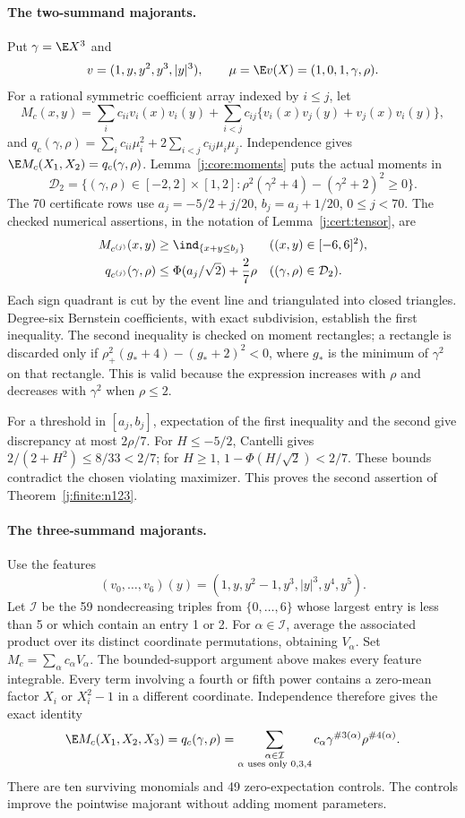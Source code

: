 \paragraph{The two-summand majorants.}
Put $\gamma=\E X^3$ and
\[
 v=(1,y,y^2,y^3,|y|^3),\qquad \mu=\E v(X)=(1,0,1,\gamma,\rho).
\]
For a rational symmetric coefficient array indexed by $i\le j$, let
\[
 M_c(x,y)=\sum_i c_{ii}v_i(x)v_i(y)+
 \sum_{i<j}c_{ij}\{v_i(x)v_j(y)+v_j(x)v_i(y)\},
\]
and $q_c(\gamma,\rho)=\sum_i c_{ii}\mu_i^2+
2\sum_{i<j}c_{ij}\mu_i\mu_j$.
Independence gives $\E M_c(X_1,X_2)=q_c(\gamma,\rho)$.
Lemma~\ref{j:core:moments} puts the actual moments in
\[
 \mathcal D_2=\{(\gamma,\rho)\in[-2,2]\times[1,2]:
 \rho^2(\gamma^2+4)-(\gamma^2+2)^2\ge0\}.
\]
The 70 certificate rows use
$a_j=-5/2+j/20$, $b_j=a_j+1/20$, $0\le j<70$.
The checked numerical assertions, in the notation of
Lemma~\ref{j:cert:tensor}, are
\begin{align*}
 M_{c^{(j)}}(x,y)&\ge\ind_{\{x+y\le b_j\}}
                    &&((x,y)\in[-6,6]^2),\\
 q_{c^{(j)}}(\gamma,\rho)&\le\Phi(a_j/\sqrt2)+\frac27\rho
                    &&((\gamma,\rho)\in\mathcal D_2).
\end{align*}
Each sign quadrant is cut by the event line and triangulated into
closed triangles.  Degree-six Bernstein coefficients, with exact
subdivision, establish the first inequality.  The second inequality is
checked on moment rectangles; a rectangle is discarded only if
$\rho_+^2(g_*+4)-(g_*+2)^2<0$, where $g_*$ is the minimum of
$\gamma^2$ on that rectangle.  This is valid because the expression
increases with $\rho$ and decreases with $\gamma^2$ when $\rho\le2$.

For a threshold in $[a_j,b_j]$, expectation of the first inequality and
the second give discrepancy at most $2\rho/7$.
For $H\le-5/2$, Cantelli gives $2/(2+H^2)\le8/33<2/7$;
for $H\ge1$, $1-\Phi(H/\sqrt2)<2/7$.
These bounds contradict the chosen violating maximizer.  This proves
the second assertion of Theorem~\ref{j:finite:n123}.

\paragraph{The three-summand majorants.}
Use the features
\[
 (v_0,\ldots,v_6)(y)=(1,y,y^2-1,y^3,|y|^3,y^4,y^5).
\]
Let $\mathcal I$ be the 59 nondecreasing triples from $\{0,\ldots,6\}$
whose largest entry is less than 5 or which contain an entry 1 or 2.
For $\alpha\in\mathcal I$, average the associated product over its
distinct coordinate permutations, obtaining $V_\alpha$.
Set $M_c=\sum_\alpha c_\alpha V_\alpha$.
The bounded-support argument above makes every feature integrable.
Every term involving a fourth or fifth power contains a zero-mean
factor $X_i$ or $X_i^2-1$ in a different coordinate.  Independence
therefore gives the exact identity
\[
 \E M_c(X_1,X_2,X_3)=q_c(\gamma,\rho)
 =\sum_{\substack{\alpha\in\mathcal I\\\alpha\text{ uses only }0,3,4}}
     c_\alpha\gamma^{\#3(\alpha)}\rho^{\#4(\alpha)}.
\]
There are ten surviving monomials and 49 zero-expectation controls.
The controls improve the pointwise majorant without adding moment
parameters.

